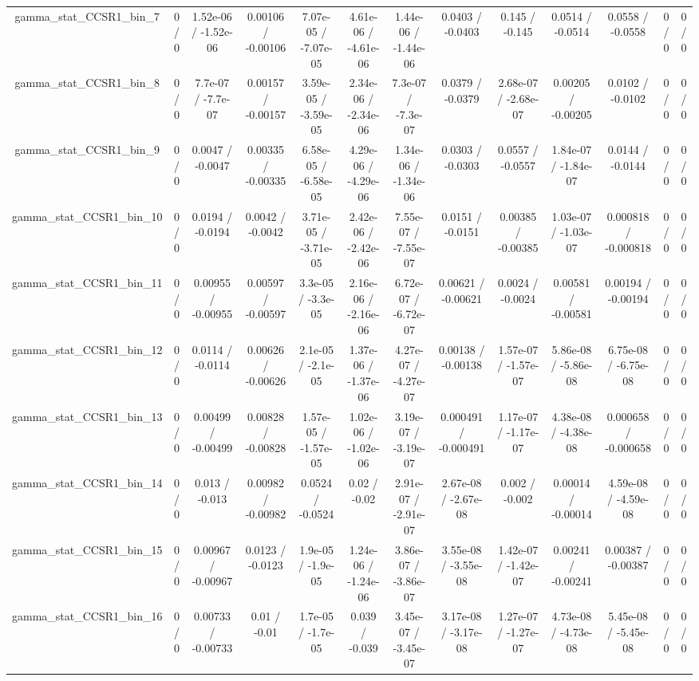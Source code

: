 \documentclass[10pt]{article}
\begin{document}
\begin{table}[htbp]
\begin{center}
\begin{tabular}{|c|c|c|c|c|c|c|c|c|c|c|c|c|}
  gamma_stat_CCSR1_bin_7 & 0 / 0 & 1.52e-06 / -1.52e-06 & 0.00106 / -0.00106 & 7.07e-05 / -7.07e-05 & 4.61e-06 / -4.61e-06 & 1.44e-06 / -1.44e-06 & 0.0403 / -0.0403 & 0.145 / -0.145 & 0.0514 / -0.0514 & 0.0558 / -0.0558 & 0 / 0 & 0 / 0 \\ 
  gamma_stat_CCSR1_bin_8 & 0 / 0 & 7.7e-07 / -7.7e-07 & 0.00157 / -0.00157 & 3.59e-05 / -3.59e-05 & 2.34e-06 / -2.34e-06 & 7.3e-07 / -7.3e-07 & 0.0379 / -0.0379 & 2.68e-07 / -2.68e-07 & 0.00205 / -0.00205 & 0.0102 / -0.0102 & 0 / 0 & 0 / 0 \\ 
  gamma_stat_CCSR1_bin_9 & 0 / 0 & 0.0047 / -0.0047 & 0.00335 / -0.00335 & 6.58e-05 / -6.58e-05 & 4.29e-06 / -4.29e-06 & 1.34e-06 / -1.34e-06 & 0.0303 / -0.0303 & 0.0557 / -0.0557 & 1.84e-07 / -1.84e-07 & 0.0144 / -0.0144 & 0 / 0 & 0 / 0 \\ 
  gamma_stat_CCSR1_bin_10 & 0 / 0 & 0.0194 / -0.0194 & 0.0042 / -0.0042 & 3.71e-05 / -3.71e-05 & 2.42e-06 / -2.42e-06 & 7.55e-07 / -7.55e-07 & 0.0151 / -0.0151 & 0.00385 / -0.00385 & 1.03e-07 / -1.03e-07 & 0.000818 / -0.000818 & 0 / 0 & 0 / 0 \\ 
  gamma_stat_CCSR1_bin_11 & 0 / 0 & 0.00955 / -0.00955 & 0.00597 / -0.00597 & 3.3e-05 / -3.3e-05 & 2.16e-06 / -2.16e-06 & 6.72e-07 / -6.72e-07 & 0.00621 / -0.00621 & 0.0024 / -0.0024 & 0.00581 / -0.00581 & 0.00194 / -0.00194 & 0 / 0 & 0 / 0 \\ 
  gamma_stat_CCSR1_bin_12 & 0 / 0 & 0.0114 / -0.0114 & 0.00626 / -0.00626 & 2.1e-05 / -2.1e-05 & 1.37e-06 / -1.37e-06 & 4.27e-07 / -4.27e-07 & 0.00138 / -0.00138 & 1.57e-07 / -1.57e-07 & 5.86e-08 / -5.86e-08 & 6.75e-08 / -6.75e-08 & 0 / 0 & 0 / 0 \\ 
  gamma_stat_CCSR1_bin_13 & 0 / 0 & 0.00499 / -0.00499 & 0.00828 / -0.00828 & 1.57e-05 / -1.57e-05 & 1.02e-06 / -1.02e-06 & 3.19e-07 / -3.19e-07 & 0.000491 / -0.000491 & 1.17e-07 / -1.17e-07 & 4.38e-08 / -4.38e-08 & 0.000658 / -0.000658 & 0 / 0 & 0 / 0 \\ 
  gamma_stat_CCSR1_bin_14 & 0 / 0 & 0.013 / -0.013 & 0.00982 / -0.00982 & 0.0524 / -0.0524 & 0.02 / -0.02 & 2.91e-07 / -2.91e-07 & 2.67e-08 / -2.67e-08 & 0.002 / -0.002 & 0.00014 / -0.00014 & 4.59e-08 / -4.59e-08 & 0 / 0 & 0 / 0 \\ 
  gamma_stat_CCSR1_bin_15 & 0 / 0 & 0.00967 / -0.00967 & 0.0123 / -0.0123 & 1.9e-05 / -1.9e-05 & 1.24e-06 / -1.24e-06 & 3.86e-07 / -3.86e-07 & 3.55e-08 / -3.55e-08 & 1.42e-07 / -1.42e-07 & 0.00241 / -0.00241 & 0.00387 / -0.00387 & 0 / 0 & 0 / 0 \\ 
  gamma_stat_CCSR1_bin_16 & 0 / 0 & 0.00733 / -0.00733 & 0.01 / -0.01 & 1.7e-05 / -1.7e-05 & 0.039 / -0.039 & 3.45e-07 / -3.45e-07 & 3.17e-08 / -3.17e-08 & 1.27e-07 / -1.27e-07 & 4.73e-08 / -4.73e-08 & 5.45e-08 / -5.45e-08 & 0 / 0 & 0 / 0 \\ 

\end{tabular}
\end{center}
\end{table}
\end{document}
